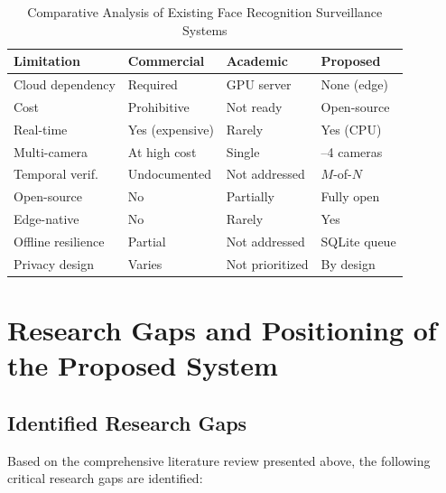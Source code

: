 \documentclass[12pt, a4paper]{article}
\begin{document}
\begin{table}[H]
    \centering
    \caption{Comparative Analysis of Existing Face Recognition Surveillance Systems}
    \label{tab:system_comparison}
    \small
    \begin{tabularx}{\textwidth}{l >{\centering\arraybackslash}X >{\centering\arraybackslash}X >{\centering\arraybackslash}X}
        \toprule
        \textbf{Limitation} & \textbf{Commercial} & \textbf{Academic} & \textbf{Proposed} \\
        \midrule
        Cloud dependency & Required & GPU server & None (edge) \\
        Cost & Prohibitive & Not ready & Open-source \\
        Real-time & Yes (expensive) & Rarely & Yes (CPU) \\
        Multi-camera & At high cost & Single & 1--4 cameras \\
        Temporal verif. & Undocumented & Not addressed & $M$-of-$N$ \\
        Open-source & No & Partially & Fully open \\
        Edge-native & No & Rarely & Yes \\
        Offline resilience & Partial & Not addressed & SQLite queue \\
        Privacy design & Varies & Not prioritized & By design \\
        \bottomrule
    \end{tabularx}
\end{table}


\section{Research Gaps and Positioning of the Proposed System}

\subsection{Identified Research Gaps}

Based on the comprehensive literature review presented above, the following critical research gaps are identified:
\end{document}
